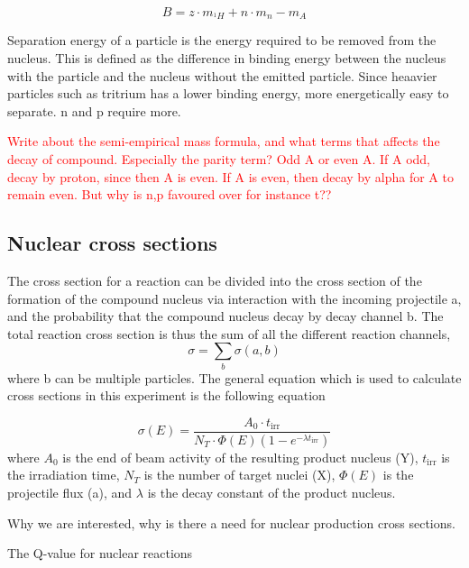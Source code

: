 \documentclass[a4paper,11pt,twoside]{book}
\begin{document}
\begin{equation}
    B = z\cdot m_{^{1}H} + n\cdot m_n - m_{A}
\end{equation}

\noindent 
Separation energy of a particle is the energy required to be removed from the nucleus. This is defined as the difference in binding energy between the nucleus with the particle and the nucleus without the emitted particle. Since heaavier particles such as tritrium has a lower binding energy, more energetically easy to separate. n and p require more. 

\textcolor{red}{Write about the semi-empirical mass formula, and what terms that affects the decay of compound. Especially the parity term? Odd A or even A. If A odd, decay by proton, since then A is even. If A is even, then decay by alpha for A to remain even. But why is n,p favoured over for instance t?? }

\subsection{Nuclear cross sections}

The cross section for a reaction can be divided into the cross section of the formation of the compound nucleus via interaction with the incoming projectile a, and the probability that the compound nucleus decay by decay channel b. The total reaction cross section is thus the sum of all the different reaction channels, 
\begin{equation}
    \sigma = \sum_b \sigma(a,b)
\end{equation}
where b can be multiple particles. The general equation which is used to calculate cross sections in this experiment is the following equation

\begin{equation}
    \sigma(E) = \frac{A_0 \cdot t_\text{irr}}{N_T \cdot \Phi(E)(1-e^{-\lambda t_\text{irr}})}
\end{equation}
\noindent where $A_0$ is the end of beam activity of the resulting product nucleus (Y), $t_\text{irr}$ is the irradiation time, $N_T$ is the number of target nuclei (X), $\Phi(E)$ is the projectile flux (a), and $\lambda$ is the decay constant of the product nucleus. 

\newpage

Why we are interested, why is there a need for nuclear production cross sections. 



The Q-value for nuclear reactions 
\end{document}
